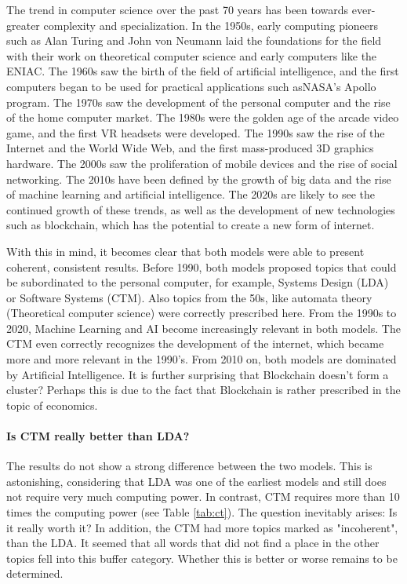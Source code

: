 \documentclass[fleqn,10pt]{SelfArx} %
\begin{document}
The trend in computer science over the past 70 years has been towards ever-greater complexity and specialization. In the 1950s, early computing pioneers such as Alan Turing and John von Neumann laid the foundations for the field with their work on theoretical computer science and early computers like the ENIAC. The 1960s saw the birth of the field of artificial intelligence, and the first computers began to be used for practical applications such asNASA's Apollo program. The 1970s saw the development of the personal computer and the rise of the home computer market. The 1980s were the golden age of the arcade video game, and the first VR headsets were developed. The 1990s saw the rise of the Internet and the World Wide Web, and the first mass-produced 3D graphics hardware. The 2000s saw the proliferation of mobile devices and the rise of social networking. The 2010s have been defined by the growth of big data and the rise of machine learning and artificial intelligence. The 2020s are likely to see the continued growth of these trends, as well as the development of new technologies such as blockchain, which has the potential to create a new form of internet.

With this in mind, it becomes clear that both models were able to present coherent, consistent results. Before 1990, both models proposed topics that could be subordinated to the personal computer, for example, Systems Design (LDA) or Software Systems (CTM). Also topics from the 50s, like automata theory (Theoretical computer science) were correctly prescribed here. From the 1990s to 2020, Machine Learning and AI become increasingly relevant in both models. The CTM even correctly recognizes the development of the internet, which became more and more relevant in the 1990's. From 2010 on, both models are dominated by Artificial Intelligence. It is further surprising that Blockchain doesn't form a cluster? Perhaps this is due to the fact that Blockchain is rather prescribed in the topic of economics.

\paragraph{Is CTM really better than LDA?}
The results do not show a strong difference between the two models. This is astonishing, considering that LDA was one of the earliest models and still does not require very much computing power. In contrast, CTM requires more than 10 times the computing power (see Table \ref{tab:ct}). The question inevitably arises: Is it really worth it? In addition, the CTM had more topics marked as "incoherent", than the LDA. It seemed that all words that did not find a place in the other topics fell into this buffer category. Whether this is better or worse remains to be determined.
\end{document}
